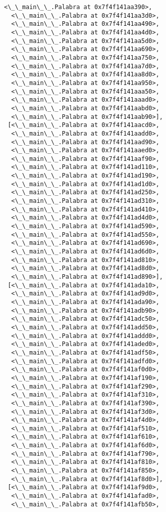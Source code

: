 \documentclass[12pt,a4paper,table]{article}
\begin{document}
\begin{tcolorbox}[breakable, size=fbox, boxrule=.5pt, pad at break*=1mm, opacityfill=0]
\begin{Verbatim}[commandchars=\\\{\}]
  <\_\_main\_\_.Palabra at 0x7f4f141aa390>,
  <\_\_main\_\_.Palabra at 0x7f4f141aa3d0>,
  <\_\_main\_\_.Palabra at 0x7f4f141aa490>,
  <\_\_main\_\_.Palabra at 0x7f4f141aa4d0>,
  <\_\_main\_\_.Palabra at 0x7f4f141aa5d0>,
  <\_\_main\_\_.Palabra at 0x7f4f141aa690>,
  <\_\_main\_\_.Palabra at 0x7f4f141aa750>,
  <\_\_main\_\_.Palabra at 0x7f4f141aa7d0>,
  <\_\_main\_\_.Palabra at 0x7f4f141aa8d0>,
  <\_\_main\_\_.Palabra at 0x7f4f141aa950>,
  <\_\_main\_\_.Palabra at 0x7f4f141aaa50>,
  <\_\_main\_\_.Palabra at 0x7f4f141aaad0>,
  <\_\_main\_\_.Palabra at 0x7f4f141aabd0>,
  <\_\_main\_\_.Palabra at 0x7f4f141aab90>],
 [<\_\_main\_\_.Palabra at 0x7f4f141aacd0>,
  <\_\_main\_\_.Palabra at 0x7f4f141aadd0>,
  <\_\_main\_\_.Palabra at 0x7f4f141aad90>,
  <\_\_main\_\_.Palabra at 0x7f4f141aaed0>,
  <\_\_main\_\_.Palabra at 0x7f4f141aaf90>,
  <\_\_main\_\_.Palabra at 0x7f4f141ad110>,
  <\_\_main\_\_.Palabra at 0x7f4f141ad190>,
  <\_\_main\_\_.Palabra at 0x7f4f141ad1d0>,
  <\_\_main\_\_.Palabra at 0x7f4f141ad250>,
  <\_\_main\_\_.Palabra at 0x7f4f141ad310>,
  <\_\_main\_\_.Palabra at 0x7f4f141ad410>,
  <\_\_main\_\_.Palabra at 0x7f4f141ad4d0>,
  <\_\_main\_\_.Palabra at 0x7f4f141ad590>,
  <\_\_main\_\_.Palabra at 0x7f4f141ad550>,
  <\_\_main\_\_.Palabra at 0x7f4f141ad690>,
  <\_\_main\_\_.Palabra at 0x7f4f141ad6d0>,
  <\_\_main\_\_.Palabra at 0x7f4f141ad810>,
  <\_\_main\_\_.Palabra at 0x7f4f141ad8d0>,
  <\_\_main\_\_.Palabra at 0x7f4f141ad890>],
 [<\_\_main\_\_.Palabra at 0x7f4f141ada10>,
  <\_\_main\_\_.Palabra at 0x7f4f141ad9d0>,
  <\_\_main\_\_.Palabra at 0x7f4f141ada90>,
  <\_\_main\_\_.Palabra at 0x7f4f141adb90>,
  <\_\_main\_\_.Palabra at 0x7f4f141adc50>,
  <\_\_main\_\_.Palabra at 0x7f4f141add50>,
  <\_\_main\_\_.Palabra at 0x7f4f141addd0>,
  <\_\_main\_\_.Palabra at 0x7f4f141aded0>,
  <\_\_main\_\_.Palabra at 0x7f4f141adf50>,
  <\_\_main\_\_.Palabra at 0x7f4f141adfd0>,
  <\_\_main\_\_.Palabra at 0x7f4f141af0d0>,
  <\_\_main\_\_.Palabra at 0x7f4f141af190>,
  <\_\_main\_\_.Palabra at 0x7f4f141af290>,
  <\_\_main\_\_.Palabra at 0x7f4f141af310>,
  <\_\_main\_\_.Palabra at 0x7f4f141af390>,
  <\_\_main\_\_.Palabra at 0x7f4f141af3d0>,
  <\_\_main\_\_.Palabra at 0x7f4f141af4d0>,
  <\_\_main\_\_.Palabra at 0x7f4f141af510>,
  <\_\_main\_\_.Palabra at 0x7f4f141af610>,
  <\_\_main\_\_.Palabra at 0x7f4f141af6d0>,
  <\_\_main\_\_.Palabra at 0x7f4f141af790>,
  <\_\_main\_\_.Palabra at 0x7f4f141af810>,
  <\_\_main\_\_.Palabra at 0x7f4f141af850>,
  <\_\_main\_\_.Palabra at 0x7f4f141af8d0>],
 [<\_\_main\_\_.Palabra at 0x7f4f141af9d0>,
  <\_\_main\_\_.Palabra at 0x7f4f141afad0>,
  <\_\_main\_\_.Palabra at 0x7f4f141afb50>,

\end{Verbatim}
\end{tcolorbox}
\end{document}
